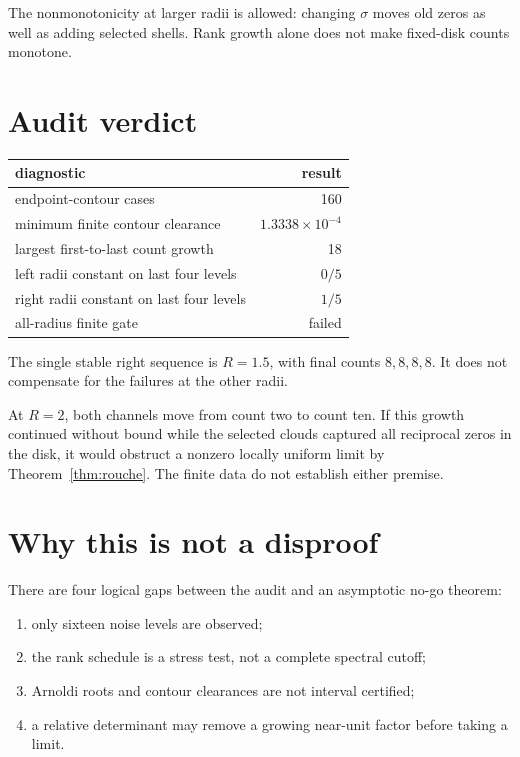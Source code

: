 \documentclass[11pt]{article}
\theoremstyle{remark}\newtheorem{remark}[theorem]{Remark}
\begin{document}
The nonmonotonicity at larger radii is allowed: changing $\sigma$ moves old
zeros as well as adding selected shells. Rank growth alone does not make
fixed-disk counts monotone.

\section{Audit verdict}

\begin{center}
\begin{tabular}{lr}
\toprule
diagnostic & result\\
\midrule
endpoint-contour cases & 160\\
minimum finite contour clearance & $1.3338\times10^{-4}$\\
largest first-to-last count growth & 18\\
left radii constant on last four levels & $0/5$\\
right radii constant on last four levels & $1/5$\\
all-radius finite gate & failed\\
\bottomrule
\end{tabular}
\end{center}

The single stable right sequence is $R=1.5$, with final counts
$8,8,8,8$. It does not compensate for the failures at the other radii.

At $R=2$, both channels move from count two to count ten. If this growth
continued without bound while the selected clouds captured all reciprocal
zeros in the disk, it would obstruct a nonzero locally uniform limit by
Theorem~\ref{thm:rouche}. The finite data do not establish either premise.

\section{Why this is not a disproof}

There are four logical gaps between the audit and an asymptotic no-go theorem:
\begin{enumerate}[leftmargin=2em]
\item only sixteen noise levels are observed;
\item the rank schedule is a stress test, not a complete spectral cutoff;
\item Arnoldi roots and contour clearances are not interval certified;
\item a relative determinant may remove a growing near-unit factor before
taking a limit.
\end{enumerate}
\end{document}
